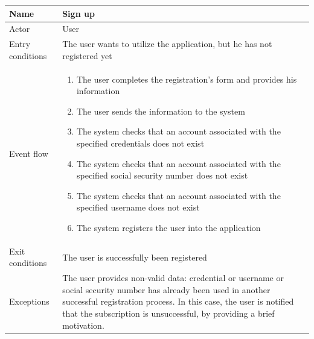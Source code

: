 \begin{table}[H]
\begin{tabularx}{\textwidth}{|l|X|}
\hline
 Name & Sign up \\ \hline
 Actor & User \\ \hline
 Entry conditions & The user wants to utilize the application, but he has not registered yet \\ \hline
 Event flow & 
 \begin{enumerate}
  	\item The user completes the registration's form and provides his information
 	\item The user sends the information to the system
 	\item The system checks that an account associated with the specified credentials does not exist
 	\item The system checks that an account associated with the specified social security number does not exist
 	\item The system checks that an account associated with the specified username does not exist
 	\item The system registers the user into the application
 \end{enumerate}   \\ \hline
 Exit conditions & The user is successfully been registered \\ \hline
 Exceptions & The user provides non-valid data: credential or username or social security number has already been used in another successful registration process. In this case, the user is notified that the subscription is unsuccessful, by providing a brief motivation. 
 \\ \hline
\end{tabularx}
\end{table}



